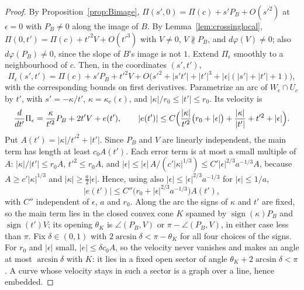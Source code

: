 \begin{proof}
By Proposition~\ref{prop:Bimage}, $\Pi(s',0)=\Pi(c)+s'P_B+O(s'^2)$ at $\epsilon=0$ with $P_B\ne0$ along the image of $B$. By
Lemma~\ref{lem:crossinglocal}, $\Pi(0,t')=\Pi(c)+t'^2V+O(t'^3)$ with $V\ne0$, $V\not\parallel P_B$, and
$d\varphi(V)\ne0$; also $d\varphi(P_B)\ne0$, since the slope of $B$'s image is not $1$. Extend $\Pi_\epsilon$ smoothly to a
neighbourhood of $c$. Then, in the coordinates $(s',t')$,
$$\Pi_\epsilon(s',t')=\Pi(c)+s'P_B+t'^2V+O\bigl(s'^2+|s't'|+|t'|^3+|\epsilon|(|s'|+|t'|+1)\bigr),$$
with the corresponding bounds on first derivatives. Parametrize an arc of $W_\epsilon\cap U_c$ by $t'$, with $s'=-\kappa/t'$,
$\kappa=\kappa_c(\epsilon)$, and $|\kappa|/r_0\le|t'|\le r_0$. Its velocity is
$$\frac{d}{dt'}\Pi_\epsilon=\frac{\kappa}{t'^2}P_B+2t'V+e(t'),\qquad |e(t')|\le C\Bigl(\frac{|\kappa|}{t'^2}\bigl(r_0+|\epsilon|\bigr)+\frac{|\kappa|}{|t'|}+t'^2+|\epsilon|\Bigr).$$
Put $A(t')=|\kappa|/t'^2+|t'|$. Since $P_B$ and $V$ are linearly independent, the main term has length at least
$c_0A(t')$. Each error term is at most a small multiple of $A$: $|\kappa|/|t'|\le r_0A$, $t'^2\le r_0A$, and
$|\epsilon|\le|\epsilon|\,A/(c'|\kappa|^{1/3})\le C'|\epsilon|^{2/3}a^{-1/3}A$, because $A\ge c'|\kappa|^{1/3}$ and
$|\kappa|\ge\frac a2|\epsilon|$. Hence, using also $|\epsilon|\le|\epsilon|^{2/3}a^{-1/3}$ for $|\epsilon|\le1/a$,
\[
|e(t')|\le C''\bigl(r_0+|\epsilon|^{2/3}a^{-1/3}\bigr)A(t'),
\]
with $C''$ independent of $\epsilon$, $a$ and $r_0$. Along the arc the signs of $\kappa$ and $t'$ are fixed, so the main term lies
in the closed convex cone $K$ spanned by $\operatorname{sign}(\kappa)P_B$ and $\operatorname{sign}(t')V$; its opening $\theta_K$ is $\angle(P_B,V)$ or
$\pi-\angle(P_B,V)$, in either case less than $\pi$. Fix $\delta\in(0,1)$ with $2\arcsin\delta<\pi-\theta_K$ for all four choices
of the signs. For $r_0$ and $|\epsilon|$ small, $|e|\le\delta c_0A$, so the velocity never vanishes and makes an angle at most
$\arcsin\delta$ with $K$: it lies in a fixed open sector of angle $\theta_K+2\arcsin\delta<\pi$. A curve whose velocity stays in
such a sector is a graph over a line, hence embedded.


\end{proof}
